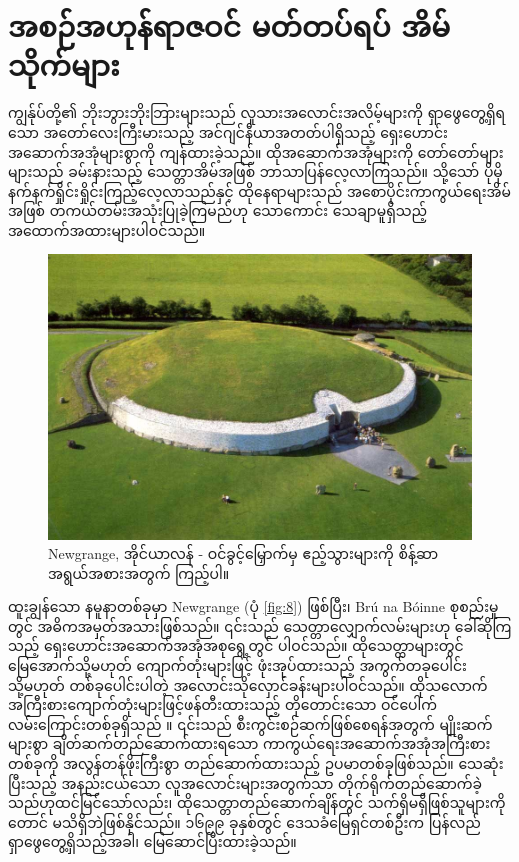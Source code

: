 \documentclass[10pt,twocolumn,letterpaper]{article}
\begin{document}
\section{အစဉ်အဟုန်ရာဇဝင် မတ်တပ်ရပ် အိမ်သိုက်များ}

ကျွန်ုပ်တို့၏ ဘိုးဘွားဘိုးဘြားများသည် လူသားအလောင်းအလိမ့်များကို ရှာဖွေတွေ့ရှိရသော အတော်လေးကြီးမားသည့် အင်ဂျင်နီယာအတတ်ပါရှိသည့် ရှေးဟောင်းအဆောက်အအုံများစွာကို ကျန်ထားခဲ့သည်။ ထိုအဆောက်အအုံများကို တော်တော်များများသည် ခမ်းနားသည့် သေတ္တာအိမ်အဖြစ် ဘာသာပြန်လေ့လာကြသည်။ သို့သော် ပိုမိုနက်နက်ရှိုင်းရှိုင်းကြည့်လေ့လာသည်နှင့် ထိုနေရာများသည် အစောပိုင်းကာကွယ်ရေးအိမ်အဖြစ် တကယ်တမ်းအသုံးပြုခဲ့ကြမည်ဟု သောကောင်း သေချာမူရှိသည့်အထောက်အထားများပါဝင်သည်။

\begin{figure}[b]
\begin{center}
   \includegraphics[width=1\linewidth]{ww19.jpg}
\end{center}
   \caption{Newgrange, အိုင်ယာလန် - ဝင်ခွင့်မြှောက်မှ ဧည့်သွားများကို စိန့်ဆာအရွယ်အစားအတွက် ကြည့်ပါ။}
\label{fig:8}
\label{fig:onecol}
\end{figure}

ထူးချွန်သော နမူနာတစ်ခုမှာ Newgrange (ပုံ \ref{fig:8}) ဖြစ်ပြီး၊ Brú na Bóinne စုစည်းမှုတွင် အဓိကအမှတ်အသားဖြစ်သည်။ ၎င်းသည် သေတ္တာလျှောက်လမ်းများဟု ခေါ်ဆိုကြသည့် ရှေးဟောင်းအဆောက်အအုံအစုရွေ့တွင် ပါဝင်သည်။ ထိုသေတ္တာများတွင် မြေအောက်သို့မဟုတ် ကျောက်တုံးများဖြင့် ဖုံးအုပ်ထားသည့် အကွက်တခုပေါင်းသို့မဟုတ် တစ်ခုပေါင်းပါတဲ့ အလောင်းသိုလှောင်ခန်းများပါဝင်သည်။ ထိုသလောက် အကြီးစားကျောက်တုံးများဖြင့်ဖန်တီးထားသည့် တိုတောင်းသော ဝင်ပေါက်လမ်းကြောင်းတစ်ခုရှိသည် \cite{70}။ ၎င်းသည် စီးကွင်းစဉ်ဆက်ဖြစ်စေရန်အတွက် မျိုးဆက်များစွာ ချိတ်ဆက်တည်ဆောက်ထားရသော ကာကွယ်ရေးအဆောက်အအုံအကြီးစားတစ်ခုကို အလွန်တန်ဖိုးကြီးစွာ တည်ဆောက်ထားသည့် ဥပမာတစ်ခုဖြစ်သည်။ သေဆုံးပြီးသည့် အနည်းငယ်သော လူအလောင်းများအတွက်သာ တိုက်ရိုက်တည်ဆောက်ခဲ့သည်ဟုထင်မြင်သော်လည်း၊ ထိုသေတ္တာတည်ဆောက်ချိန်တွင် သက်ရှိမရှိဖြစ်သူများကိုတောင် မသိရှိဘဲဖြစ်နိုင်သည်။ ၁၆၉၉ ခုနှစ်တွင် ဒေသခံမြေရှင်တစ်ဦးက ပြန်လည်ရှာဖွေတွေ့ရှိသည့်အခါ၊ မြေဆောင်ပြီးထားခဲ့သည်။
\end{document}
